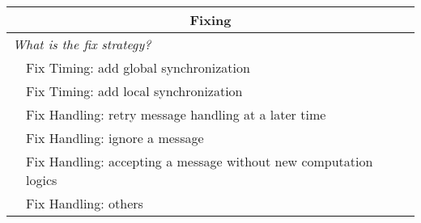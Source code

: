 \begin{table}[!htb]
\begin{tabular}{lp{5.5in}}
\multicolumn{2}{c}{{\bf Fixing} }\\
\midrule
\multicolumn{2}{l}{\it What is the fix strategy?}\\
&{Fix Timing: add global synchronization}\\
&{Fix Timing: add local synchronization}\\
&{Fix Handling: retry message handling at a later time}\\
&{Fix Handling: ignore a message}\\
&{Fix Handling: accepting a message without new computation logics}\\
&{Fix Handling: others}\\
\bottomrule
\end{tabular}
\end{table}
